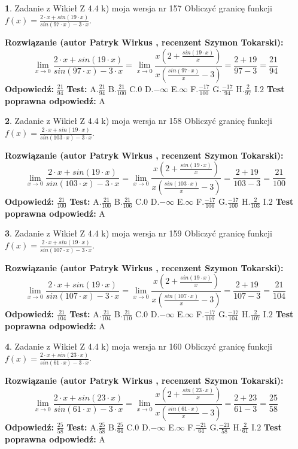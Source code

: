 \documentclass[12pt, a4paper]{article}
\theoremstyle{definition} %
\newtheorem{zad}{}
\newcommand{\zadStart}[1]{\begin{zad}#1\newline}
\newcommand{\zadStop}{\end{zad}}
\newcommand{\rozwStart}[2]{\noindent \textbf{Rozwiązanie (autor #1 , recenzent #2): }\newline}
\newcommand{\rozwStop}{\newline}
\newcommand{\odpStart}{\noindent \textbf{Odpowiedź:}\newline}
\newcommand{\odpStop}{\newline}
\newcommand{\testStart}{\noindent \textbf{Test:}\newline}
\newcommand{\testStop}{\newline}
\newcommand{\kluczStart}{\noindent \textbf{Test poprawna odpowiedź:}\newline}
\newcommand{\kluczStop}{\newline}
\begin{document}
\zadStart{Zadanie z Wikieł Z 4.4 k) moja wersja nr 157}
Obliczyć granicę funkcji $f(x)=\frac{2\cdot x +sin(19\cdot x)}{sin(97\cdot x) -3\cdot x}$.
\zadStop
\rozwStart{Patryk Wirkus}{Szymon Tokarski}
$$\lim\limits_{x\to 0}\frac{2\cdot x +sin(19\cdot x)}{sin(97\cdot x) -3\cdot x}
=\lim\limits_{x\to 0}\frac{x(2+\frac{sin(19\cdot x)}{x})}{x(\frac{sin(97\cdot x)}{x}-3)}
=\frac{2+19}{97-3} = \frac{21}{94}$$
\rozwStop
\odpStart
$\frac{21}{94}$
\odpStop
\testStart
A.$\frac{21}{94}$
B.$\frac{21}{100}$
C.$0$
D.$-\infty$
E.$\infty$
F.$\frac{-17}{100}$
G.$\frac{-17}{94}$
H.$\frac{2}{97}$
I.$2$
\testStop
\kluczStart
A
\kluczStop



\zadStart{Zadanie z Wikieł Z 4.4 k) moja wersja nr 158}
Obliczyć granicę funkcji $f(x)=\frac{2\cdot x +sin(19\cdot x)}{sin(103\cdot x) -3\cdot x}$.
\zadStop
\rozwStart{Patryk Wirkus}{Szymon Tokarski}
$$\lim\limits_{x\to 0}\frac{2\cdot x +sin(19\cdot x)}{sin(103\cdot x) -3\cdot x}
=\lim\limits_{x\to 0}\frac{x(2+\frac{sin(19\cdot x)}{x})}{x(\frac{sin(103\cdot x)}{x}-3)}
=\frac{2+19}{103-3} = \frac{21}{100}$$
\rozwStop
\odpStart
$\frac{21}{100}$
\odpStop
\testStart
A.$\frac{21}{100}$
B.$\frac{21}{106}$
C.$0$
D.$-\infty$
E.$\infty$
F.$\frac{-17}{106}$
G.$\frac{-17}{100}$
H.$\frac{2}{103}$
I.$2$
\testStop
\kluczStart
A
\kluczStop



\zadStart{Zadanie z Wikieł Z 4.4 k) moja wersja nr 159}
Obliczyć granicę funkcji $f(x)=\frac{2\cdot x +sin(19\cdot x)}{sin(107\cdot x) -3\cdot x}$.
\zadStop
\rozwStart{Patryk Wirkus}{Szymon Tokarski}
$$\lim\limits_{x\to 0}\frac{2\cdot x +sin(19\cdot x)}{sin(107\cdot x) -3\cdot x}
=\lim\limits_{x\to 0}\frac{x(2+\frac{sin(19\cdot x)}{x})}{x(\frac{sin(107\cdot x)}{x}-3)}
=\frac{2+19}{107-3} = \frac{21}{104}$$
\rozwStop
\odpStart
$\frac{21}{104}$
\odpStop
\testStart
A.$\frac{21}{104}$
B.$\frac{21}{110}$
C.$0$
D.$-\infty$
E.$\infty$
F.$\frac{-17}{110}$
G.$\frac{-17}{104}$
H.$\frac{2}{107}$
I.$2$
\testStop
\kluczStart
A
\kluczStop



\zadStart{Zadanie z Wikieł Z 4.4 k) moja wersja nr 160}
Obliczyć granicę funkcji $f(x)=\frac{2\cdot x +sin(23\cdot x)}{sin(61\cdot x) -3\cdot x}$.
\zadStop
\rozwStart{Patryk Wirkus}{Szymon Tokarski}
$$\lim\limits_{x\to 0}\frac{2\cdot x +sin(23\cdot x)}{sin(61\cdot x) -3\cdot x}
=\lim\limits_{x\to 0}\frac{x(2+\frac{sin(23\cdot x)}{x})}{x(\frac{sin(61\cdot x)}{x}-3)}
=\frac{2+23}{61-3} = \frac{25}{58}$$
\rozwStop
\odpStart
$\frac{25}{58}$
\odpStop
\testStart
A.$\frac{25}{58}$
B.$\frac{25}{64}$
C.$0$
D.$-\infty$
E.$\infty$
F.$\frac{-21}{64}$
G.$\frac{-21}{58}$
H.$\frac{2}{61}$
I.$2$
\testStop
\kluczStart
A
\kluczStop
\end{document}
